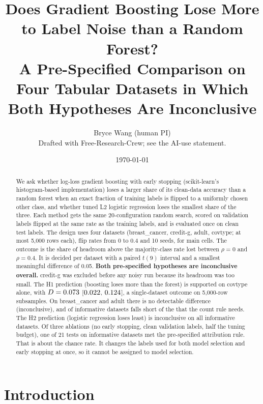 \documentclass[11pt]{article}
\title{Does Gradient Boosting Lose More to Label Noise than a Random Forest?\\
A Pre-Specified Comparison on Four Tabular Datasets in Which\\
Both Hypotheses Are Inconclusive}
\author{Bryce Wang (human PI) \\ \small Drafted with Free-Research-Crew; see the AI-use statement.}
\date{\today}
\newcommand{\ds}[1]{\textsf{#1}}
\newcommand{\bc}{\ds{breast\_cancer}}
\newcommand{\cg}{\ds{credit-g}}
\newcommand{\ad}{\ds{adult}}
\newcommand{\ct}{\ds{covtype}}
\begin{document}
\maketitle

\begin{abstract}
We ask whether log-loss gradient boosting with early stopping (scikit-learn's
histogram-based implementation) loses a larger share of its clean-data accuracy
than a random forest when an exact fraction of training labels is flipped to a uniformly
chosen other class, and whether tuned L2 logistic regression loses the smallest share of
the three. Each method gets the same 20-configuration random search, scored on validation
labels flipped at the same rate as the training labels, and is evaluated once on clean test
labels. The design uses four datasets (\bc, \cg, \ad, \ct; at most 5,000 rows each),
flip rates from 0 to 0.4 and 10 seeds, for \NCells{} main cells. The outcome is the share of
headroom above the majority-class rate lost between $\rho=0$ and $\rho=0.4$. It is decided
per dataset with a paired $t(9)$ interval and a smallest meaningful difference of 0.05.
\textbf{Both pre-specified hypotheses are inconclusive overall.} \cg{} was excluded before
any noisy run because its headroom was too small. The H1 prediction (boosting loses more
than the forest) is supported on \ct{} alone, with $D = 0.073$
[$0.022$, $0.124$], a single-dataset outcome on 5,000-row subsamples. On \bc{} and
\ad{} there is no detectable difference (inconclusive), and \HOneNSup{} of
\HOneNInf{} informative datasets falls short of the \HOneNNeed{} that the count rule needs.
The H2 prediction (logistic regression loses least) is inconclusive on all \HTwoNInf{}
informative datasets. Of three ablations (no early stopping, clean validation labels, half
the tuning budget), one of 21 tests on informative datasets met the pre-specified
attribution rule. That is about the chance rate. It changes the labels used for both model
selection and early stopping at once, so it cannot be assigned to model selection.
\end{abstract}

\section{Introduction}
\label{sec:intro}
\end{document}
